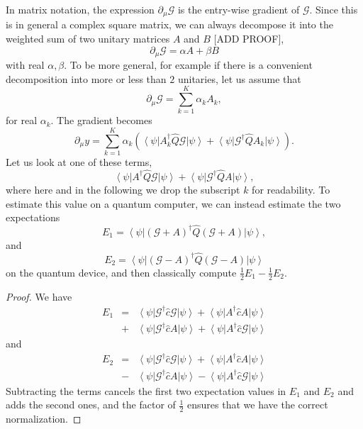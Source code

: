 \documentclass[aps,pra,10pt,twocolumn,groupedaddress,nofootinbib]{revtex4-1}
\theoremstyle{plain}
\newcommand{\ket}[1]{\ensuremath{\left| #1 \right \rangle}}
\newcommand{\bra}[1]{\ensuremath{\left \langle #1 \right |}}
\newcommand{\G}{\mathcal{G}}
\begin{document}
In matrix notation, the expression $\partial_{\mu}\G$ is the entry-wise gradient of $\G$. Since this is in general a complex square matrix, we can always decompose it into the weighted sum of two unitary matrices $A$ and $B$ [ADD PROOF],
\[\partial_{\mu}\G = \alpha A + \beta B \]
with real $\alpha, \beta$. To be more general, for example if there is a convenient decomposition into more or less than $2$ unitaries, let us assume that
\begin{equation} 
	\partial_{\mu}\G = \sum_{k=1}^K \alpha_k A_k, 
	\label{Eq:deriv_decomp}
\end{equation}
for real $\alpha_k$. The gradient becomes
\begin{equation*}
	\partial_{\mu} y  = \sum_{k=1}^K \alpha_k  \left( \bra{\psi} A_k^{\dagger}  \hat{Q} \G \ket{\psi} +  \bra{\psi}\G^{\dagger} \hat{Q} A_k  \ket{\psi} \right).
\end{equation*}
Let us look at one of these terms,
\begin{equation}
	\bra{\psi} A^{\dagger}  \hat{Q} \G \ket{\psi} +  \bra{\psi}\G^{\dagger} \hat{Q} A  \ket{\psi},
\label{Eq:term_to_estimate}
\end{equation}
where here and in the following we drop the subscript $k$ for readability. To estimate this value on a quantum computer, we can instead estimate the two expectations
\begin{equation}
	E_1 = \bra{\psi} (\G + A)^{\dagger} \hat{Q} (\G + A) \ket{\psi},		\label{Eq:E1}
\end{equation}
and
\begin{equation}
	E_2= \bra{\psi}(\G - A)^{\dagger}  \hat{Q} (\G - A) \ket{\psi}
	\label{Eq:E2}
\end{equation}
on the quantum device, and then classically compute $\frac{1}{2}E_1 - \frac{1}{2} E_2$.
\begin{proof}
We have
\begin{eqnarray*}
	E_1 &= &\bra{\psi} \G^{\dagger} \hat{c} \G \ket{\psi} + \bra{\psi} A^{\dagger} \hat{c} A \ket{\psi} \\
	&+& \bra{\psi} \G^{\dagger} \hat{c} A \ket{\psi}+ \bra{\psi} A^{\dagger} \hat{c} \G \ket{\psi}
\end{eqnarray*}
and
\begin{eqnarray*}
	E_2 &= & \bra{\psi} \G^{\dagger} \hat{c} \G \ket{\psi} + \bra{\psi} A^{\dagger} \hat{c} A \ket{\psi} \\
	&-& \bra{\psi} \G^{\dagger} \hat{c} A \ket{\psi}- \bra{\psi} A^{\dagger} \hat{c} \G \ket{\psi}
\end{eqnarray*}
Subtracting the terms cancels the first two expectation values in $E_1$ and $E_2$ and adds the second ones, and the factor of $\frac{1}{2}$ ensures that we have the correct normalization.
\end{proof}
\end{document}
